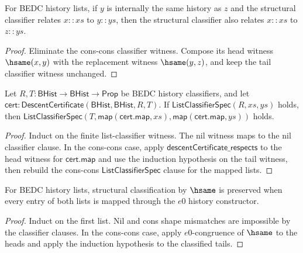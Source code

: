 \begin{theorem}
\label{thm:list-classifier-hsame-cons-head-transport}
For BEDC history lists, if \(y\) is internally the same history as \(z\) and
the structural classifier relates \(x::xs\) to \(y::ys\), then the structural
classifier also relates \(x::xs\) to \(z::ys\).
\end{theorem}
\begin{proof}
Eliminate the cons-cons classifier witness. Compose its head witness
\(\hsame(x,y)\) with the replacement witness \(\hsame(y,z)\), and keep the
tail classifier witness unchanged.
\end{proof}

\begin{theorem}
\label{thm:list-classifier-certified-entry-descent}
Let $R,T:\mathsf{BHist}\to\mathsf{BHist}\to\mathsf{Prop}$ be BEDC history
classifiers, and let
$\mathsf{cert}:\mathsf{DescentCertificate}(\mathsf{BHist},\mathsf{BHist},R,T)$.
If
$\mathsf{ListClassifierSpec}(R,xs,ys)$ holds, then
$\mathsf{ListClassifierSpec}(T,\mathsf{map}(\mathsf{cert.map},xs),\mathsf{map}(\mathsf{cert.map},ys))$ holds.
\end{theorem}
\begin{proof}
Induct on the finite list-classifier witness. The nil witness maps to the nil
classifier clause. In the cons-cons case, apply
$\mathsf{descentCertificate\_respects}$ to the head witness for
$\mathsf{cert.map}$ and use the induction hypothesis on the tail witness, then
rebuild the cons-cons $\mathsf{ListClassifierSpec}$ clause for the mapped lists.
\end{proof}

\begin{theorem}
\label{thm:list-classifier-hsame-map-e0}
For BEDC history lists, structural classification by $\hsame$ is preserved when every entry of both lists is mapped through the $e0$ history constructor.
\end{theorem}
\begin{proof}
Induct on the first list. Nil and cons shape mismatches are impossible by the classifier clauses. In the cons-cons case, apply $e0$-congruence of $\hsame$ to the heads and apply the induction hypothesis to the classified tails.
\end{proof}

